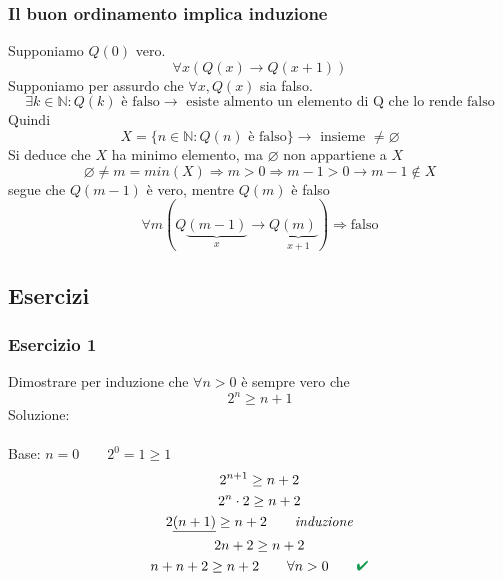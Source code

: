 \documentclass[italian]{article}
\renewcommand{\checkmark}{\textcolor{ForestGreen}{\text{$\qquad$\ding{52}}}}
\begin{document}
\subsubsection{Il buon ordinamento implica induzione}
Supponiamo $Q(0)$ vero.
\[
	\forall x(Q(x) \to Q(x+1))
\]
Supponiamo per assurdo che $\forall x, Q(x)$  sia falso.
\[
	\exists k \in \mathbb{N} : Q(k) \text{ è falso} \to \text{ esiste almento un elemento di Q che lo rende falso}
\]
Quindi
\[
	X = \{n \in \mathbb{N} : Q(n) \text{ è falso}\} \to \text{ insieme $\neq\varnothing$}
\]
Si deduce che $X$ ha minimo elemento, ma $\varnothing$ non appartiene a $X$
\[
	\varnothing \neq m = min(X) \Rightarrow m > 0 \Rightarrow m - 1 > 0 \to m-1 \notin X
\]
segue che $Q(m-1)$  è  vero, mentre $Q(m)$ è falso
\[
	\forall m (Q\underbrace{(m-1)}_{x}\to Q\underbrace{(m)}_{x+1}) \Rightarrow \text{falso}
\]

\subsection{Esercizi}
\subsubsection{Esercizio 1}
Dimostrare per induzione che $\forall n > 0$ è sempre vero che
\[ 2^n \geq n + 1 \]
Soluzione:\\\\
Base: $n=0 \qquad 2^0=1 \geq 1$ \checkmark
\begin{gather*}
	2^{n+1} \geq n+2 \\
	2^n\cdot 2 \geq n+ 2\\
	2\underline{(n+1)} \geq n+2 \qquad \textit{induzione}\\
	2n+2 \geq n+2\\
	n+n + 2 \geq n + 2 \qquad \forall n>0 \checkmark
\end{gather*}
\end{document}
